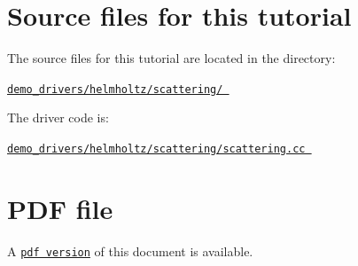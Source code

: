  

\hypertarget{index_sources}{}\section{Source files for this tutorial}\label{index_sources}

\begin{DoxyItemize}
\item The source files for this tutorial are located in the directory\+: \begin{center} \href{../../../../demo_drivers/helmholtz/scattering}{\tt demo\+\_\+drivers/helmholtz/scattering/ } \end{center} 
\item The driver code is\+: \begin{center} \href{../../../../demo_drivers/helmholtz/scattering/scattering.cc}{\tt demo\+\_\+drivers/helmholtz/scattering/scattering.\+cc } \end{center} 
\end{DoxyItemize}



 

 \hypertarget{index_pdf}{}\section{P\+D\+F file}\label{index_pdf}
A \href{../latex/refman.pdf}{\tt pdf version} of this document is available. 

